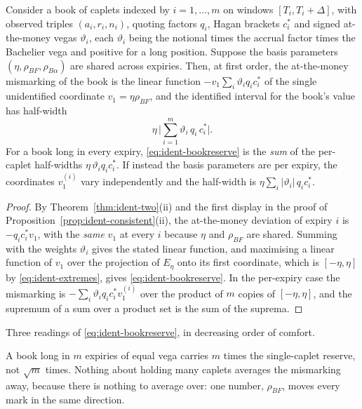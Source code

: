 \documentclass[../../../main.tex]{subfiles}
\begin{document}
\begin{corollary}\label{cor:ident-book}
Consider a book of caplets indexed by $i=1,\dots,m$ on windows $[T_i,T_i+\Delta]$, with observed triples $(a_i,r_i,n_i)$, quoting factors $q_i$, Hagan brackets $c^*_i$ and signed at-the-money vegas $\vartheta_i$, each $\vartheta_i$ being the notional times the accrual factor times the Bachelier vega and positive for a long position. Suppose the basis parameters $(\eta,\rho_{BF},\rho_{B\alpha})$ are shared across expiries. Then, at first order, the at-the-money mismarking of the book is the linear function $-v_1\sum_{i}\vartheta_iq_ic^*_i$ of the single unidentified coordinate $v_1=\eta\rho_{BF}$, and the identified interval for the book's value has half-width
\begin{equation}\label{eq:ident-bookreserve}
\eta\,\Big|\sum_{i=1}^m\vartheta_i\,q_i\,c^*_i\Big| .
\end{equation}
For a book long in every expiry, \eqref{eq:ident-bookreserve} is the \emph{sum} of the per-caplet half-widths $\eta\,\vartheta_iq_ic^*_i$. If instead the basis parameters are per expiry, the coordinates $v_1^{(i)}$ vary independently and the half-width is $\eta\sum_i|\vartheta_i|\,q_ic^*_i$.
\end{corollary}

\begin{proof}
By Theorem~\ref{thm:ident-two}(ii) and the first display in the proof of Proposition~\ref{prop:ident-consistent}(ii), the at-the-money deviation of expiry $i$ is $-q_ic^*_iv_1$, with the \emph{same} $v_1$ at every $i$ because $\eta$ and $\rho_{BF}$ are shared. Summing with the weights $\vartheta_i$ gives the stated linear function, and maximising a linear function of $v_1$ over the projection of $E_\eta$ onto its first coordinate, which is $[-\eta,\eta]$ by \eqref{eq:ident-extremes}, gives \eqref{eq:ident-bookreserve}. In the per-expiry case the mismarking is $-\sum_i\vartheta_iq_ic^*_iv_1^{(i)}$ over the product of $m$ copies of $[-\eta,\eta]$, and the supremum of a sum over a product set is the sum of the suprema.
\end{proof}

Three readings of \eqref{eq:ident-bookreserve}, in decreasing order of comfort.

A book long in $m$ expiries of equal vega carries $m$ times the single-caplet reserve, not $\sqrt m$ times. Nothing about holding many caplets averages the mismarking away, because there is nothing to average over: one number, $\rho_{BF}$, moves every mark in the same direction.
\end{document}
